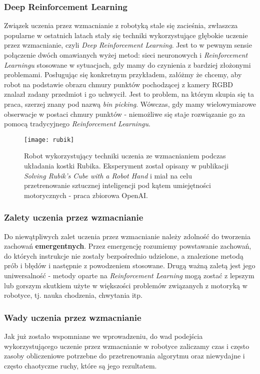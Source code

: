 \documentclass[12pt]{article}
\begin{document}
\subsubsection*{Deep Reinforcement Learning}
Związek uczenia przez wzmacnianie z robotyką stale się zacieśnia, zwłaszcza popularne w ostatnich latach stały się techniki wykorzystujące głębokie uczenie przez wzmacnianie, czyli \emph{Deep Reinforcement Learning}. Jest to w pewnym sensie połączenie dwóch omawianych wyżej metod: sieci neuronowych i \emph{Reinforcement Learningu} stosowane w sytuacjach, gdy mamy do czynienia z bardziej złożonymi problemami. Posługując się konkretnym przykładem, załóżmy że chcemy, aby robot na podstawie obrazu chmury punktów pochodzącej z kamery RGBD znalazł zadany przedmiot i go uchwycił. Jest to problem, na którym skupia się ta praca, szerzej znany pod nazwą \emph{bin picking}. Wówczas, gdy mamy wielowymiarowe obserwacje w postaci chmury punktów - niemożliwe się staje rozwiązanie go za pomocą tradycyjnego \emph{Reinforcement Learningu}. 

\begin{figure}[h]
\centering
\texttt{[image: rubik]}
\caption{Robot wykorzystujący techniki uczenia ze wzmacnianiem podczas układania kostki Rubika. Eksperyment został opisany w publikacji \emph{Solving Rubik's Cube with a Robot Hand} i miał na celu przetrenowanie sztucznej inteligencji pod kątem umiejętności motorycznych - praca zbiorowa OpenAI.}
\end{figure}

\newpage
\subsubsection*{Zalety uczenia przez wzmacnianie}
Do niewątpliwych zalet uczenia przez wzmacnianie należy zdolność do tworzenia zachowań \textbf{emergentnych}. Przez emergencję rozumiemy powstawanie zachowań, do których instrukcje nie zostały bezpośrednio udzielone, a znalezione metodą prób i błędów i następnie z powodzeniem stosowane. Drugą ważną zaletą jest jego uniwersalność - metody oparte na \emph{Reinforcement Learning} mogą zostać z lepszym lub gorszym skutkiem użyte w większości problemów związanych z motoryką w robotyce, tj. nauka chodzenia, chwytania itp.

\subsubsection*{Wady uczenia przez wzmacnianie}
Jak już zostało wspomniane we wprowadzeniu, do wad podejścia wykorzystującego uczenie przez wzmacnianie w robotyce zaliczamy czas i często zasoby obliczeniowe potrzebne do przetrenowania algorytmu oraz niewydajne i często chaotyczne ruchy, które są jego rezultatem.
\end{document}
